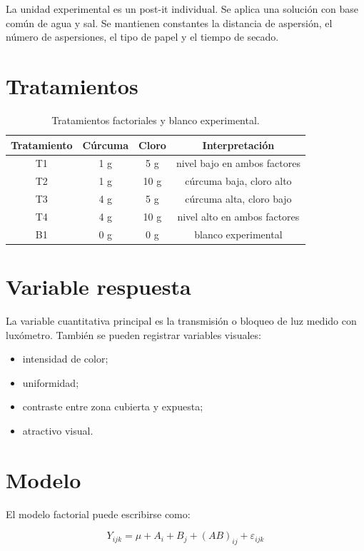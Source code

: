La unidad experimental es un post-it individual. Se aplica una solución con base común de agua y sal. Se mantienen constantes la distancia de aspersión, el número de aspersiones, el tipo de papel y el tiempo de secado.

\section{Tratamientos}

\begin{table}[H]
\centering
\begin{tabular}{cccc}
\toprule
Tratamiento & Cúrcuma & Cloro & Interpretación\\
\midrule
T1 & 1 g & 5 g & nivel bajo en ambos factores\\
T2 & 1 g & 10 g & cúrcuma baja, cloro alto\\
T3 & 4 g & 5 g & cúrcuma alta, cloro bajo\\
T4 & 4 g & 10 g & nivel alto en ambos factores\\
B1 & 0 g & 0 g & blanco experimental\\
\bottomrule
\end{tabular}
\caption{Tratamientos factoriales y blanco experimental.}
\end{table}

\section{Variable respuesta}

La variable cuantitativa principal es la transmisión o bloqueo de luz medido con luxómetro. También se pueden registrar variables visuales:

\begin{itemize}
  \item intensidad de color;
  \item uniformidad;
  \item contraste entre zona cubierta y expuesta;
  \item atractivo visual.
\end{itemize}

\section{Modelo}

El modelo factorial puede escribirse como:

\[
Y_{ijk} = \mu + A_i + B_j + (AB)_{ij} + \varepsilon_{ijk}
\]

